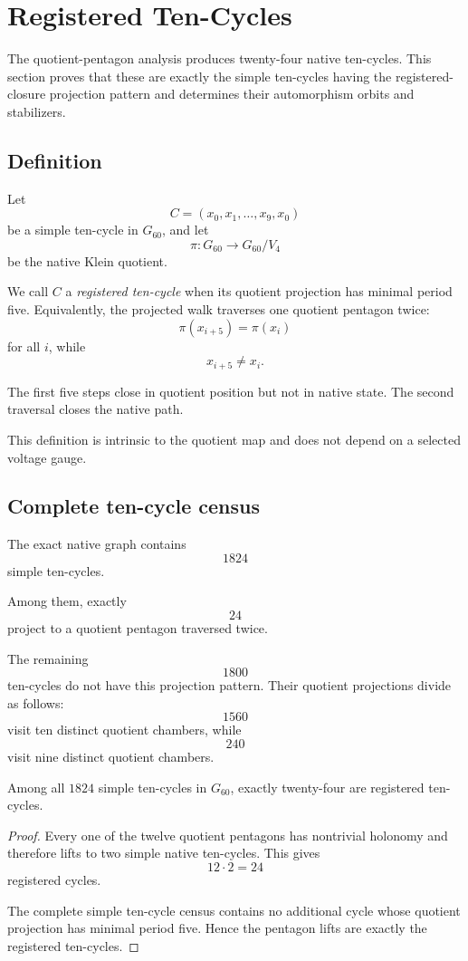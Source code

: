 \section{Registered Ten-Cycles}

The quotient-pentagon analysis produces twenty-four native
ten-cycles. This section proves that these are exactly the simple
ten-cycles having the registered-closure projection pattern and
determines their automorphism orbits and stabilizers.

\subsection{Definition}

Let
\[
C=(x_0,x_1,\ldots,x_9,x_0)
\]
be a simple ten-cycle in \(G_{60}\), and let
\[
\pi:G_{60}\longrightarrow G_{60}/V_4
\]
be the native Klein quotient.

We call \(C\) a \emph{registered ten-cycle} when its quotient
projection has minimal period five. Equivalently, the projected walk
traverses one quotient pentagon twice:
\[
\pi(x_{i+5})=\pi(x_i)
\]
for all \(i\), while
\[
x_{i+5}\neq x_i.
\]

The first five steps close in quotient position but not in native
state. The second traversal closes the native path.

This definition is intrinsic to the quotient map and does not depend
on a selected voltage gauge.

\subsection{Complete ten-cycle census}

The exact native graph contains
\[
1824
\]
simple ten-cycles.

Among them, exactly
\[
24
\]
project to a quotient pentagon traversed twice.

The remaining
\[
1800
\]
ten-cycles do not have this projection pattern. Their quotient
projections divide as follows:
\[
1560
\]
visit ten distinct quotient chambers, while
\[
240
\]
visit nine distinct quotient chambers.

\begin{theorem}
Among all \(1824\) simple ten-cycles in \(G_{60}\), exactly twenty-four
are registered ten-cycles.
\end{theorem}

\begin{proof}
Every one of the twelve quotient pentagons has nontrivial holonomy and
therefore lifts to two simple native ten-cycles. This gives
\[
12\cdot2=24
\]
registered cycles.

The complete simple ten-cycle census contains no additional cycle
whose quotient projection has minimal period five. Hence the
pentagon lifts are exactly the registered ten-cycles.
\end{proof}

